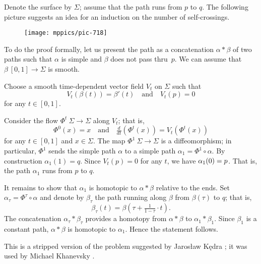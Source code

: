 Denote the surface by $\Sigma$; assume that the path runs from $p$ to $q$.
The following picture suggests an idea for an induction on the number of self-crossings.

\begin{figure}[!ht]
\vskip0mm
\centering
\texttt{[image: mppics/pic-718]}
\end{figure}

To do the proof formally,
let us present the path as a concatenation $\alpha*\beta$ of two paths  such that $\alpha$ is simple
and $\beta$ does not pass thru~$p$.
We can assume that $\beta\:[0,1]\to \Sigma$ is smooth.

Choose a smooth time-dependent vector field $V_t$ on $\Sigma$ such that
\[V_t(\beta(t))=\beta'(t)\quad\text{and}\quad V_t(p)=0\]
for any $t\in[0,1]$. 

Consider the flow $\Phi^t\:\Sigma\to \Sigma$ along $V_t$;
that is,
\[\Phi^0(x)=x\quad\text{and}\quad \tfrac{d}{dt}(\Phi^t(x))=V_t(\Phi^t(x))\]
for any $t\in[0,1]$ and $x\in \Sigma$.
The map $\Phi^1\:\Sigma\to \Sigma$ is a diffeomorphism;
in particular, $\Phi^1$ sends the simple path $\alpha$ to a simple path $\alpha_1=\Phi^1\circ\alpha$.
By construction $\alpha_1(1)=q$. 
Since $V_t(p)=0$ for any $t$, we have $\alpha_1(0)\z=p$.
That is, the path $\alpha_1$ runs from $p$ to $q$.

It remains to show that $\alpha_1$ is homotopic to $\alpha*\beta$ relative to the ends.
Set $\alpha_\tau=\Phi^\tau\circ\alpha$ and denote by  $\beta_\tau$ the path running along $\beta$ from $\beta(\tau)$ to $q$;
that is, 
\[\beta_\tau(t)=\beta(\tau+\tfrac1{1-\tau}\cdot t).\]
The concatenation $\alpha_\tau*\beta_\tau$ provides a homotopy from $\alpha*\beta$ to $\alpha_1*\beta_1$. 
Since $\beta_1$ is a constant path, $\alpha*\beta$ is homotopic to $\alpha_1$.
Hence the statement follows.
\qeds

This is a stripped version of the problem suggested by Jaros{\l}aw K\k{e}dra \cite{One-step}; 
it was used by Michael Khanevsky \cite[Lemma 3 in][]{khanevsky}.
